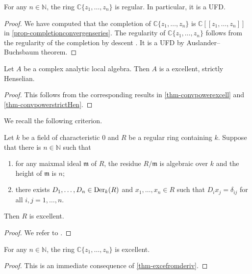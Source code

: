 \begin{thm}\label{thm-convpowerregular}
    For any $n\in \mathbb{N}$, the ring $\mathbb{C}\{ z_1,\ldots,z_n \}$ is regular. In particular, it is a UFD.
\end{thm}
\begin{proof}
    We have computed that the completion of $\mathbb{C}\{ z_1,\ldots,z_n \}$ is $\mathbb{C}[[ z_1,\ldots,z_n ]]$ in \cref{prop-completionconvergenseries}. The regularity of $\mathbb{C}\{ z_1,\ldots,z_n \}$ follows from the regularity of the completion by descent \cite[\href{https://stacks.math.columbia.edu/tag/07NY}{Tag 07NY}]{stacks-project}. It is a UFD by Auslander--Buchsbaum theorem.
\end{proof}
\begin{proposition}\label{prop-analocalgwellbehaved}
    Let $A$ be a complex analytic local algebra. Then $A$ is a excellent, strictly Henselian. 
\end{proposition}
\begin{proof}
    This follows from the corresponding results in \cref{thm-convpowerexcell} and \cref{thm-convpowerstrictHen}.
\end{proof}


We recall the following criterion.
\begin{thm}\label{thm-excefromderiv}
    Let $k$ be a field of characteristic $0$ and $R$ be a regular ring containing $k$. Suppose that there is $n\in \mathbb{N}$ such that
    \begin{enumerate}
        \item for any maixmal ideal $\mathfrak{m}$ of $R$, the residue $R/\mathfrak{m}$ is algebraic over $k$ and the height of $\mathfrak{m}$ is $n$;
        \item there exists $D_1,\ldots, D_n\in \operatorname{Der}_k(R)$ and $x_1,\ldots,x_n\in R$ such that $D_ix_j=\delta_{ij}$ for all $i,j=1,\ldots,n$. 
    \end{enumerate}
    Then $R$ is excellent.
\end{thm}
\begin{proof}
    We refer to \cite[Theorem~102]{Mat80}.
\end{proof}

\begin{thm}\label{thm-convpowerexcell}
    For any $n\in \mathbb{N}$, the ring $\mathbb{C}\{ z_1,\ldots,z_n \}$ is excellent.
\end{thm}
\begin{proof}
    This is an immediate consequence of \cref{thm-excefromderiv}.
\end{proof}

